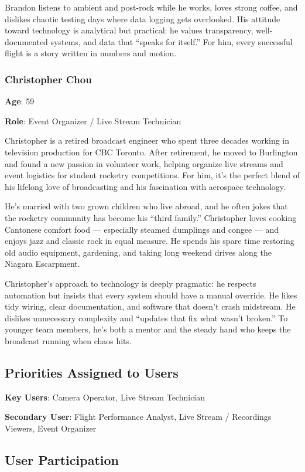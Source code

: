 \documentclass[12pt]{article}
\begin{document}
Brandon listens to ambient and post-rock while he works, loves strong coffee,
and dislikes chaotic testing days where data logging gets overlooked. His
attitude toward technology is analytical but practical: he values transparency,
well-documented systems, and data that “speaks for itself.” For him, every
successful flight is a story written in numbers and motion.

\subsubsection*{Christopher Chou}

\textbf{Age}: 59

\textbf{Role}: Event Organizer / Live Stream Technician

Christopher is a retired broadcast engineer who spent three decades working in
television production for CBC Toronto. After retirement, he moved to Burlington
and found a new passion in volunteer work, helping organize live streams and
event logistics for student rocketry competitions. For him, it’s the perfect
blend of his lifelong love of broadcasting and his fascination with aerospace
technology.

He’s married with two grown children who live abroad, and he often jokes that
the rocketry community has become his “third family.” Christopher loves cooking
Cantonese comfort food — especially steamed dumplings and congee — and enjoys
jazz and classic rock in equal measure. He spends his spare time restoring old
audio equipment, gardening, and taking long weekend drives along the Niagara
Escarpment.

Christopher’s approach to technology is deeply pragmatic: he respects
automation but insists that every system should have a manual override. He
likes tidy wiring, clear documentation, and software that doesn’t crash
midstream. He dislikes unnecessary complexity and “updates that fix what wasn’t
broken.” To younger team members, he’s both a mentor and the steady hand who
keeps the broadcast running when chaos hits.
\subsection{Priorities Assigned to Users}

\textbf{Key Users}: Camera Operator, Live Stream Technician

\textbf{Secondary User}: Flight Performance Analyst, Live Stream / Recordings Viewers, Event Organizer

\subsection{User Participation}
\end{document}
